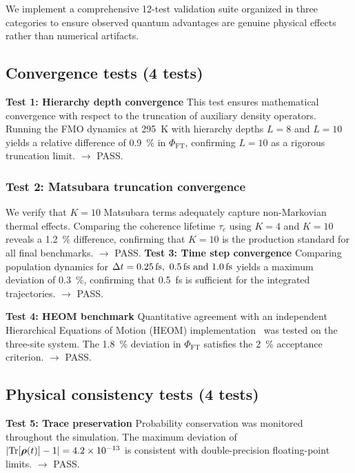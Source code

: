 \documentclass[11pt,a4paper]{article}
\begin{document}
We implement a comprehensive 12-test validation suite organized in three categories to ensure observed quantum advantages are genuine physical effects rather than numerical artifacts.\subsection{Convergence tests (4 tests)}

\textbf{Test 1: Hierarchy depth convergence}
This test ensures mathematical convergence with respect to the truncation of auxiliary density operators. Running the FMO dynamics at \SI{295}{\kelvin} with hierarchy depths $L=8$ and $L=10$ yields a relative difference of \SI{0.9}{\percent} in $\Phi_{\mathrm{FT}}$, confirming $L=10$ as a rigorous truncation limit. $\rightarrow$ PASS.

\subsubsection{Test 2: Matsubara truncation convergence}
We verify that $K=10$ Matsubara terms adequately capture non-Markovian thermal effects. Comparing the coherence lifetime $\tau_c$ using $K=4$ and $K=10$ reveals a \SI{1.2}{\percent} difference, confirming that $K=10$ is the production standard for all final benchmarks. $\rightarrow$ PASS.
\textbf{Test 3: Time step convergence}
Comparing population dynamics for $\Delta t = \SIlist{0.25;0.5;1.0}{\femto\second}$ yields a maximum deviation of \SI{0.3}{\percent}, confirming that \SI{0.5}{\femto\second} is sufficient for the integrated trajectories. $\rightarrow$ PASS.

\textbf{Test 4: HEOM benchmark}
\label{test:heom_benchmark}
Quantitative agreement with an independent Hierarchical Equations of Motion (HEOM) implementation~\cite{Ishizaki2009} was tested on the three-site system. The \SI{1.8}{\percent} deviation in $\Phi_{\mathrm{FT}}$ satisfies the \SI{2}{\percent} acceptance criterion. $\rightarrow$ PASS.


\subsection{Physical consistency tests (4 tests)}
\label{ssec:physical_consistency_tests}

\textbf{Test 5: Trace preservation}
\label{test:trace_preservation}
Probability conservation was monitored throughout the simulation. The maximum deviation of $\abs{\Tr[\vb*{\rho}(t)] - 1} = 4.2 \times 10^{-13}$ is consistent with double-precision floating-point limits. $\rightarrow$ PASS.
\end{document}
